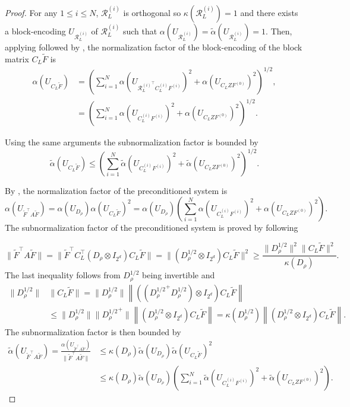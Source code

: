 \documentclass[onefignum,onetabnum]{siamart251216}
\begin{document}
\begin{proof}
For any  $1\leq i \leq N$, $\mathcal{R}_L^{(i)}$ is orthogonal so
$\kappa(\mathcal{R}_L^{(i)}) = 1$ and there exists a block-encoding $U_{\mathcal{R}_L^{(i)}}$ of $\mathcal{R}_L^{(i)}$ such that $\alpha(U_{\mathcal{R}_L^{(i)}})=\tilde\alpha(U_{\mathcal{R}_L^{(i)}}) =1$. Then, applying \cite[(3.1.e)]{Deiml_2025} followed by \cite[(3.1.d)]{Deiml_2025}, the normalization factor of the block-encoding of the block matrix $C_L \tilde{F}$ is
\[
\begin{aligned}
\alpha (U_{C_L \tilde{F}}) &= \left( \sum_{i=1}^{N} \alpha\left(U_{{\mathcal{R}_L^{(i)}}^\top C_L^{(i)} F^{(i)}}\right)^2 + \alpha \left(U_{C_L Z F^{(0)}} \right)^2 \right)^{1/2},
\\ &= \left( \sum_{i=1}^{N} \alpha\left(U_{C_L^{(i)} F^{(i)}}\right)^2 + \alpha \left(U_{C_L Z F^{(0)}} \right)^2   \right)^{1/2}.
\end{aligned}
\]



Using the same arguments the subnormalization factor is bounded by
\[
\tilde{\alpha} \left(U_{C_L \tilde{F}}\right) \leq \left( \sum_{i=1}^{N} \tilde{\alpha}\left(U_{  C_L^{(i)} F^{(i)}}\right)^2 + \tilde{\alpha}\left( U_{C_L Z F^{(0)}} \right)^2 \right)^{1/2}.
\]

By \cite[(3.1.d)]{Deiml_2025}, the normalization factor of the preconditioned system is 
\[
\alpha (U_{\tilde{F}^\top A \tilde{F}}) = \alpha(U_{D_\rho}) \alpha(U_{C_L \tilde{F}})^2 = \alpha(U_{D_\rho}) \left( \sum_{i=1}^{N} \alpha(U_{C_L^{(i)} F^{(i)}})^2 + \alpha \left(U_{C_L Z F^{(0)}} \right)^2 \right).
\]
The subnormalization factor of the preconditioned system is proved by following \cite[Proof of Theorem 6.2]{Deiml_2025}

\[
\| \tilde{F}^\top A \tilde{F} \| = \|\tilde{F}^\top C_L^\top \left( D_{\rho} \otimes I_{2^d} \right) C_L \tilde{F} \| = \|\left( D_{\rho}^{1/2} \otimes I_{2^d} \right) C_L \tilde{F} \|^2 \geq \frac{\| D_\rho^{1/2} \|^2 \| C_L \tilde{F} \|^2}{ \kappa(D_\rho)}.
\]
The last inequality follows from $D_{\rho}^{1/2}$ being invertible and 
\[
\begin{aligned}
\| D_\rho^{1/2} \|& \| C_L \tilde{F} \| = \| D_\rho^{1/2} \| \left\| \left( ( {D_\rho^{1/2}}^+ D_\rho^{1/2})\otimes I_{2^d}\right) C_L \tilde{F} \right\| 
\\& \leq \| D_\rho^{1/2} \| \| {D_\rho^{1/2}}^+ \| \left\|\left(D_\rho^{1/2} \otimes I_{2^d} \right) C_L \tilde{F} \right\| 
 = \kappa(D_\rho^{1/2}) \left\| \left(D_\rho^{1/2} \otimes I_{2^d} \right) C_L \tilde{F} \right\|.
\end{aligned}
\]
The subnormalization factor is then bounded by
\[
\begin{aligned}
\tilde{\alpha} (U_{\tilde{F}^\top A \tilde{F}})  = \frac{\alpha (U_{\tilde{F}^\top A \tilde{F}})}{\| \tilde{F}^\top A \tilde{F} \|} & \leq \kappa(D_\rho) \tilde{\alpha}(U_{D_\rho}) \tilde{\alpha}(U_{C_L \tilde{F}})^2 \\
& \leq \kappa(D_\rho) \tilde{\alpha}(U_{D_\rho}) \left( \sum_{i=1}^{N} \tilde{\alpha}\left(U_{C_L^{(i)} F^{(i)}}\right)^2 + \tilde{\alpha}\left( U_{C_L Z F^{(0)}} \right)^2  \right).
\end{aligned}
\]


\end{proof}
\end{document}
